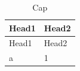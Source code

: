 \documentclass{article}
\begin{document}
\begin{longtable}{ll}
\caption{Cap}\label{t}
\hline
Head1 & Head2 \\
\hline
\endfirsthead
\hline
Head1 & Head2 \\
\endhead
a & 1 \\
\end{longtable}
\end{document}
